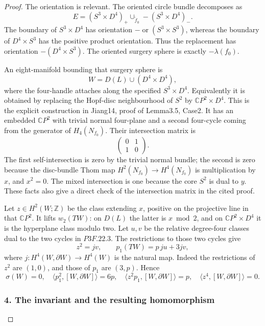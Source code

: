 \begin{proof}
The orientation is relevant. The oriented circle bundle decomposes as \[
 E=(S^3\times D^4)_+\cup_{\widetilde f_0}
                                      -(S^3\times D^4)_-.
\] The boundary of \(S^3\times D^4\) has orientation \(-\operatorname{or}(S^3\times S^3)\), whereas the boundary of \(D^4\times S^3\) has the positive product orientation. Thus the replacement has orientation \(-(D^4\times S^3)\). The oriented surgery sphere is exactly \(-\lambda(f_0)\).

An eight-manifold bounding that surgery sphere is \[
 W=D(L)\cup (D^4\times D^4),
\] where the four-handle attaches along the specified \(S^3\times D^4\). Equivalently it is obtained by replacing the Hopf-disc neighbourhood of \(S^2\) by \(\mathbb CP^2\times D^4\). This is the explicit construction in Jiang14, proof of Lemma3.5, Case2. It has an embedded \(\mathbb CP^2\) with trivial normal four-plane and a second four-cycle coming from the generator of \(H_4(N_{f_0})\). Their intersection matrix is \[
 \begin{pmatrix}0&1\\1&0\end{pmatrix}.              \tag{P3F.22.3}
\] The first self-intersection is zero by the trivial normal bundle; the second is zero because the disc-bundle Thom map \(H^2(N_{f_0})\to H^4(N_{f_0})\) is multiplication by \(x\), and \(x^2=0\). The mixed intersection is one because the core \(S^2\) is dual to \(y\). These facts also give a direct check of the intersection matrix in the cited proof.

Let \(z\in H^2(W;\mathbb Z)\) be the class extending \(x\), positive on the projective line in that \(\mathbb CP^2\). It lifts \(w_2(TW)\): on \(D(L)\) the latter is \(x\bmod2\), and on \(\mathbb CP^2\times D^4\) it is the hyperplane class modulo two. Let \(u,v\) be the relative degree-four classes dual to the two cycles in \(P3F.22.3\). The restrictions to those two cycles give \[
 z^2=jv,\qquad p_1(TW)=p\,ju+3jv,
\] where \(j:H^4(W,\partial W)\to H^4(W)\) is the natural map. Indeed the restrictions of \(z^2\) are \((1,0)\), and those of \(p_1\) are \((3,p)\). Hence \[
 \sigma(W)=0,\quad
 \langle p_1^2,[W,\partial W]\rangle=6p,\quad
 \langle z^2p_1,[W,\partial W]\rangle=p,\quad
 \langle z^4,[W,\partial W]\rangle=0.              \tag{P3F.22.4}
\]

\subsubsection{4. The invariant and the resulting homomorphism}\label{the-invariant-and-the-resulting-homomorphism}


\end{proof}
